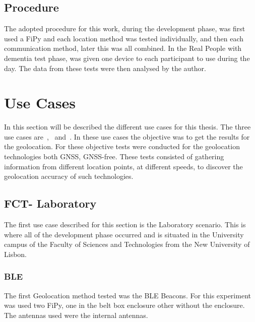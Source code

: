 
\subsection{Procedure}
\label{subsec:Procedure}
The adopted procedure for this work, during the development phase, was first used a FiPy and each location method was tested individually, and then each communication method, later this was all combined. In the Real People with dementia test phase, was given one device to each participant to use during the day. The data from these tests were then analysed by the author.

\section{Use Cases}

In this section will be described the different use cases for this thesis. The three  use cases are~,~ and~. In these use cases the objective was to get the results for the geolocation. 
For these objective  tests were conducted for the geolocation technologies both GNSS, GNSS-free. These tests consisted of gathering information from different location points, at different speeds, to discover the geolocation accuracy of such technologies. 


\newpage

\subsection{FCT- Laboratory}
\label{subsec:laboratory}
The first use case described for this section is the Laboratory scenario. This is where all of the development phase occurred and is situated in the University campus of the Faculty of Sciences and Technologies from the New University of Lisbon.


\subsubsection{BLE}
\label{subsubsec:Geo_BLE}
The first  Geolocation method tested was the BLE Beacons. For this experiment was used two FiPy, one in the belt box enclosure other without the enclosure. The antennas used were the internal antennas. 

